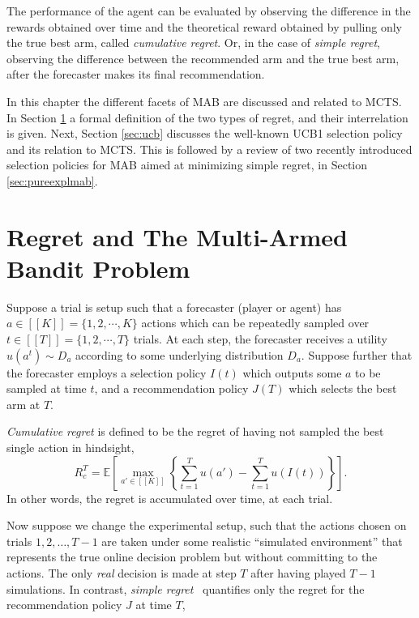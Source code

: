 \documentclass{kecsmstr}
\newcommand{\bE}{\mathbb{E}}
\begin{document}
The performance of the agent can be evaluated by observing the difference in the rewards obtained over time and the theoretical reward obtained by pulling only the true best arm, called \emph{cumulative regret}. Or, in the case of \emph{simple regret}, observing the difference between the recommended arm and the true best arm, after the forecaster makes its final recommendation.
\vspace{2 mm}

In this chapter the different facets of MAB are discussed and related to MCTS. In Section \ref{sec:mabprob} a formal definition of the two types of regret, and their interrelation is given. Next, Section \ref{sec:ucb} discusses the well-known UCB1 selection policy and its relation to MCTS. This is followed by a review of two recently introduced selection policies for MAB aimed at minimizing simple regret, in Section \ref{sec:pureexplmab}.

\section{Regret and The Multi-Armed Bandit Problem}
\label{sec:mabprob}
Suppose a trial is setup such that a forecaster (player or agent) has $a \in [[K]] = \{ 1, 2, \cdots , K \}$ actions which can be repeatedly sampled over $t \in [[T]] = \{ 1, 2, \cdots, T \}$ trials. At each step, the forecaster receives a utility $u(a^t) \sim D_a$ according to some underlying distribution $D_a$. Suppose further that the forecaster employs a selection policy $I(t)$ which outputs some $a$ to be sampled at time $t$, and a recommendation policy $J(T)$ which selects the best arm at $T$.

\emph{Cumulative regret} is defined to be the regret of having not sampled the best single action in hindsight, 
\begin{equation}
R_c^T = \bE \left[ \max_{a' \in [[K]]} \left\{ \sum_{t=1}^T u(a') - \sum_{t=1}^T u(I(t)) \right\} \right].
\end{equation}
In other words, the regret is accumulated over time, at each trial.

Now suppose we change the experimental setup, such that the actions chosen on trials $1, 2, \ldots, T-1$ are taken under some realistic ``simulated environment'' that represents the true online decision problem but without committing to the actions. The only \emph{real} decision is made at step $T$ after having played $T-1$ simulations. In contrast, \emph{simple regret}~ quantifies only the regret for the recommendation policy $J$ at time $T$,
\end{document}
